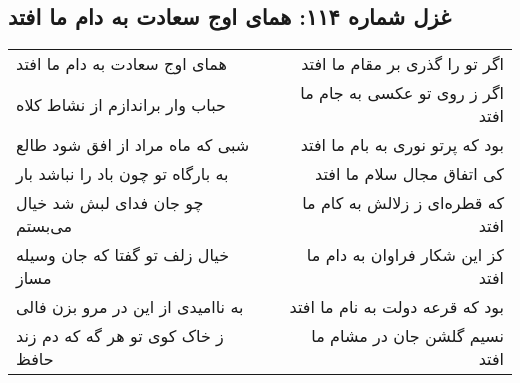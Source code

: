 \begin{center}
\section*{غزل شماره ۱۱۴: همای اوج سعادت به دام ما افتد}
\label{sec:sh114}
\begin{longtable}{l p{0.5cm} r}
همای اوج سعادت به دام ما افتد
&&
اگر تو را گذری بر مقام ما افتد
\\
حباب وار براندازم از نشاط کلاه
&&
اگر ز روی تو عکسی به جام ما افتد
\\
شبی که ماه مراد از افق شود طالع
&&
بود که پرتو نوری به بام ما افتد
\\
به بارگاه تو چون باد را نباشد بار
&&
کی اتفاق مجال سلام ما افتد
\\
چو جان فدای لبش شد خیال می‌بستم
&&
که قطره‌ای ز زلالش به کام ما افتد
\\
خیال زلف تو گفتا که جان وسیله مساز
&&
کز این شکار فراوان به دام ما افتد
\\
به ناامیدی از این در مرو بزن فالی
&&
بود که قرعه دولت به نام ما افتد
\\
ز خاک کوی تو هر گه که دم زند حافظ
&&
نسیم گلشن جان در مشام ما افتد
\\
\end{longtable}
\end{center}
